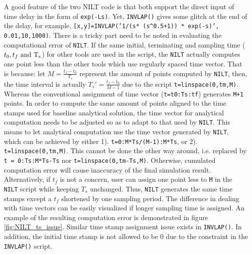 \documentclass[11pt]{tCON2e}
\theoremstyle{plain}\newtheorem{theorem}{Theorem}
\theoremstyle{definition}
\theoremstyle{remark}
\begin{document}
A good feature of the two NILT code is that both support the direct input of time delay in the form of {\tt exp(-Ls)}. Yet, {\tt INVLAP()} gives some glitch at the end of the delay, for example, {\tt [x,y]=INVLAP('1/(s* (s\string^0.5+1)) * exp(-s)', 0.01,10,1000)}.
There is a tricky part need to be noted in evaluating the computational error of {\tt NILT}. If the same initial, terminating and sampling time ($t_0, t_f\ \rm{and} \ T_s$) for other tools are used in the script, the {\tt NILT} actually computes one point less than the other tools which use regularly spaced time vector. That is because: let $M = \frac{t_f-t_0}{T_s}$ represent the amount of points computed by {\tt NILT}, then, the time interval is actually $T_s' = \frac{t_f-t_0}{M-1}$ due to the script {\tt t=linspace(0,tm,M)}. Whereas the conventional assignment of time vector ({\tt t=t0:Ts:tf}) generates {\tt M+1} points. In order to compute the same amount of points aligned to the time stamps used for baseline analytical solution, the time vector for analytical computation needs to be adjusted so as to adapt to that used by {\tt NILT}. This means to let analytical computation use the time vector generated by {\tt NILT}, which can be achieved by either 1). {\tt t=0:M*Ts/(M-1):M*Ts}, or 2). {\tt t=linspace(0,tm,M)}. This cannot be done the other way around, i.e. replaced by {\tt t = 0:Ts:M*Ts-Ts} nor {\tt t=linspace(0,tm-Ts,M)}. Otherwise, cumulated computation error will cause inaccuracy of the final simulation result. Alternatively, if $t_f$ is not a concern, user can assign one point less to {\tt M} in the {\tt NILT} script while keeping $T_s$ unchanged. Thus, {\tt NILT} generates the same time stamps except a $t_f$ shortened by one sampling period. The difference in dealing with time vectors can be easily visualized if longer sampling time is assigned. An example of the resulting computation error is demonstrated in figure \ref{fig:NILT_ts_issue}. Similar time stamp assignment issue exists in {\tt INVLAP()}. In addition, the initial time stamp is not allowed to be $0$ due to the constraint in the {\tt INVLAP()} script.
\end{document}
